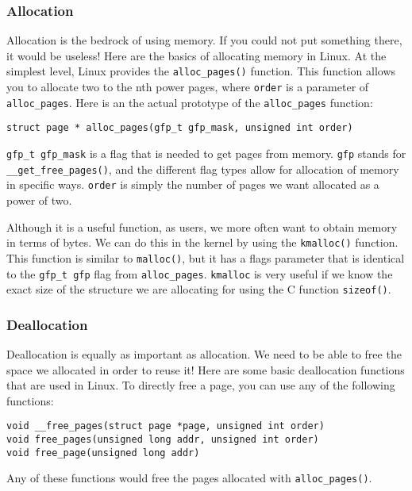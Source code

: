 \documentclass[10pt,letterpaper,onecolumn,draftclsnofoot]{IEEEtran}
\begin{document}
\subsubsection{Allocation}
Allocation is the bedrock of using memory. If you could not put something
there, it would be useless! Here are the basics of allocating memory in
Linux. At the simplest level, Linux provides the \texttt{alloc\_pages()}
function. This function allows you to allocate two to the nth power pages,
where \texttt{order} is a parameter of \texttt{alloc\_pages}. Here is an
the actual prototype of the \texttt{alloc\_pages} function:
\begin{lstlisting}[caption=The alloc\_pages function allows manual allocation of requested pages]
struct page * alloc_pages(gfp_t gfp_mask, unsigned int order)
\end{lstlisting}
\texttt{gfp\_t gfp\_mask} is a flag that is needed to get pages from memory.
\texttt{gfp} stands for \texttt{\_\_get\_free\_pages()}, and the different
flag types allow for allocation of memory in specific ways.\cite{robertlove2010}
\texttt{order} is simply the number of pages we want allocated as a power
of two.

Although it is a useful function, as users, we more often want to obtain
memory in terms of bytes. We can do this in the kernel by using the
\texttt{kmalloc()} function. This function is similar to \texttt{malloc()},
but it has a flags parameter that is identical to the \texttt{gfp\_t gfp}
flag from \texttt{alloc\_pages}. \texttt{kmalloc} is very useful if we
know the exact size of the structure we are allocating for using the C
function \texttt{sizeof()}. 

\subsubsection{Deallocation}
Deallocation is equally as important as allocation. We need to be able
to free the space we allocated in order to reuse it! Here are some basic
deallocation functions that are used in Linux. To directly free a page,
you can use any of the following functions:
\begin{lstlisting}[caption=Void pointers to the free pages functions]
void __free_pages(struct page *page, unsigned int order)
void free_pages(unsigned long addr, unsigned int order)
void free_page(unsigned long addr)
\end{lstlisting}
Any of these functions would free the pages allocated with \texttt{alloc\_pages()}.
\end{document}
